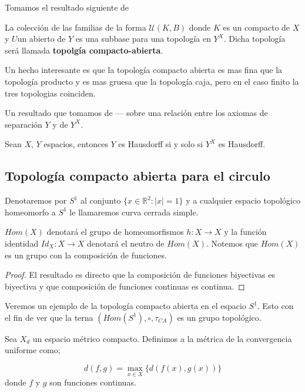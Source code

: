 
Tomamos el resultado siguiente de 

\begin{pr}
	La colección de las familias de la forma $\mathcal{U}(K,B)$ donde $K$ es un compacto de $X$ y $U$un abierto de $Y$ es una subbase para una topología en $Y^X$. Dicha topología será llamada \textbf{topolgía compacto-abierta}.
\end{pr}

\begin{ob}
Un hecho interesante es que la topología compacto abierta es mas fina que la topología producto y es mas gruesa que la topología caja, pero en el caso finito la tres topologias coinciden.
\end{ob}

Un resultado que tomamos de --- sobre una relación entre los axiomas de separación  $Y$ y de $Y^X$.

\begin{pr}
Sean $X$, $Y$ espacios, entonces $Y$ es Hausdorff si y solo si $Y^X$ es Hausdorff.
\end{pr}


\subsection*{Topología compacto abierta para el circulo}

Denotaremos por $S^1$ al conjunto $\{x \in\mathbb{R}^2:|x|=1 \}$ y a cualquier espacio topológico homeomorfo a $S^1$ le llamaremos curva cerrada simple.


	\begin{nt} $Hom(X)$ denotará el grupo de homeomorfismos $h:X \to X$ y la función identidad $Id_X:X \to X$ denotará el neutro de $Hom(X)$. Notemos que $Hom(X)$ es un grupo con la composición de funciones.
	\end{nt}
	
		\begin{proof}
	El resultado es directo que la composición de funciones biyectivas es biyectiva y que composición de funciones continuas es continua. 
	\end{proof}
	

 Veremos un ejemplo de la topología compacto abierta en el espacio $S^1$. Esto con el fin de ver que la terna $(Hom(S^1),\circ, \tau_{CA})$ es un grupo topológico. 


\begin{df}
Sea $X_d$ un espacio métrico compacto. Definimos a la métrica de la convergencia uniforme como;

$$d(f,g)= \max_{x \in X}\{d(f(x),g(x)) \}$$
donde $f$ y $g$ son funciones continuas. 
\end{df}


